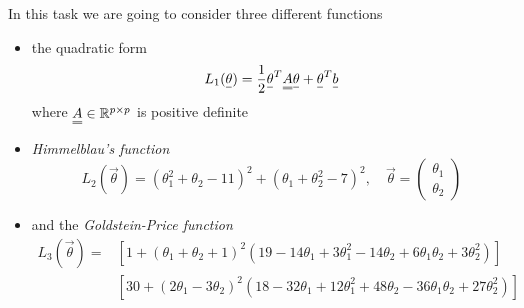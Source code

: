     In this task we are going to consider three different 
    functions
    \begin{itemize}
        \item the quadratic form
        \begin{equation}
            L_1(\vec{\theta}) = \frac{1}{2} \vec{\theta}^T \mat{A} \vec{\theta} + \vec{\theta}^T \vec{b}
        \end{equation}
        where $\mat{A} \in \mathbb{R}^{p \times p}$ is positive definite
        \item \textit{Himmelblau's function}
        \begin{equation}
            L_2(\vec{\theta}) = (\theta_1^2 + \theta_2 - 11)^2 + (\theta_1 + \theta_2^2 - 7)^2, \quad \vec{\theta} = \begin{pmatrix}
                \theta_1 \\
                \theta_2
            \end{pmatrix}
        \end{equation}
        \item and the \textit{Goldstein-Price function}
        \begin{equation}
            \begin{aligned}
L_3(\vec{\theta}) = & \left[ 1 + (\theta_1 + \theta_2 + 1)^2 (19 - 14\theta_1 + 3\theta_1^2 - 14\theta_2 + 6\theta_1\theta_2 + 3\theta_2^2) \right] \\
& \left[ 30 + (2\theta_1 - 3\theta_2)^2 (18 - 32\theta_1 + 12\theta_1^2 + 48\theta_2 - 36\theta_1\theta_2 + 27\theta_2^2) \right]
\end{aligned}
        \end{equation}
    \end{itemize}


